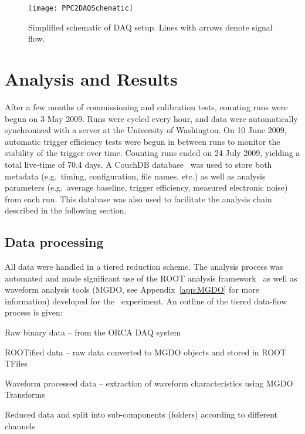 	
			\begin{sidewaysfigure}
				\centering
				\texttt{[image: PPC2DAQSchematic]}
				\caption[Simplified schematic of DAQ setup] 
				{Simplified schematic of DAQ setup.  Lines with arrows denote signal flow.}
				\label{fig:PPC2DAQSetup}
			\end{sidewaysfigure}
		     			
	\section{Analysis and Results}
	\label{sec:DeploymentPPC2SoudanAnalysis}
	
	After a few months of commissioning and calibration tests, counting runs were begun on 3 May 2009.  Runs were cycled every hour, and data were automatically synchronized with a server at the University of Washington.  On 10 June 2009, automatic trigger efficiency tests were begun in between runs to monitor the stability of the trigger over time.  Counting runs ended on 24 July 2009, yielding a total live-time of 70.4 days.  A CouchDB database~\cite{CouchDB} was used to store both metadata (e.g.~timing, configuration, file names, etc.) as well as analysis parameters (e.g.~average baseline, trigger efficiency, measured electronic noise) from each run.  This database was also used to facilitate the analysis chain described in the following section.    

		\subsection{Data processing}
		\label{sec:DeploymentPPC2DataProcessing}	
	
	All data were handled in a tiered reduction scheme.  The analysis process was automated and made significant use of the ROOT analysis framework~\cite{Bru97} as well as waveform analysis tools (MGDO, see Appendix~\ref{app:MGDO} for more information) developed for the \MJ~experiment.  An outline of the tiered data-flow process is given:
		\begin{description}\itemsep2pt
			\item[Tier 0:]  Raw binary data -- from the ORCA DAQ system
			\item[Tier 1:]  ROOTified data -- raw data converted to MGDO objects and stored in ROOT TFiles
			\item[Tier 2:]  Waveform processed data -- extraction of waveform characteristics using MGDO Transforms
			\item[Tier 3:]  Reduced data and split into sub-components (folders) according to different channels
		\end{description}	
		
